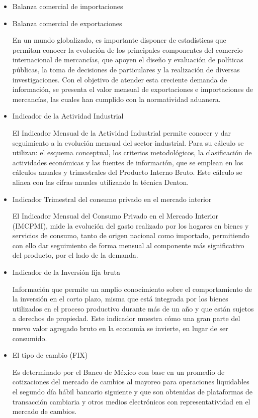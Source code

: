 \documentclass[a4paper]{article}
\begin{document}
\begin{itemize}
\item   	Balanza comercial de importaciones
\item   	Balanza comercial de exportaciones

En un mundo globalizado, es importante disponer de estadísticas que permitan conocer la evolución de los principales componentes del comercio internacional de mercancías, que apoyen el diseño y evaluación de políticas públicas, la toma de decisiones de particulares y la realización de diversas investigaciones. Con el objetivo de atender esta creciente demanda de información, se presenta el valor mensual de exportaciones e importaciones de mercancías, las cuales han cumplido con la normatividad aduanera.

\item   	Indicador de la Actividad Industrial

El Indicador Mensual de la Actividad Industrial permite conocer y dar seguimiento a la evolución mensual del sector industrial. Para su cálculo se utilizan: el esquema conceptual, los criterios metodológicos, la clasificación de actividades económicas y las fuentes de información, que se emplean en los cálculos anuales y trimestrales del Producto Interno Bruto. Este cálculo se alinea con las cifras anuales utilizando la técnica Denton.

\item   	Indicador Trimestral del consumo privado en el mercado interior

El Indicador Mensual del Consumo Privado en el Mercado Interior (IMCPMI), mide la evolución del gasto realizado por los hogares en bienes y servicios de consumo, tanto de origen nacional como importado, permitiendo con ello dar seguimiento de forma mensual al componente más significativo del producto, por el lado de la demanda.

\item   	Indicador de la Inversión fija bruta

Información que permite un amplio conocimiento sobre el comportamiento de la inversión en el corto plazo, misma que está integrada por los bienes utilizados en el proceso productivo durante más de un año y que están sujetos a derechos de propiedad. Este indicador muestra cómo una gran parte del nuevo valor agregado bruto en la economía se invierte, en lugar de ser consumido.

\item   	El tipo de cambio (FIX)

Es determinado por el Banco de México con base en un promedio de cotizaciones del mercado de cambios al mayoreo para operaciones liquidables el segundo día hábil bancario siguiente y que son obtenidas de plataformas de transacción cambiaria y otros medios electrónicos con representatividad en el mercado de cambios.

\end{itemize}
\end{document}
